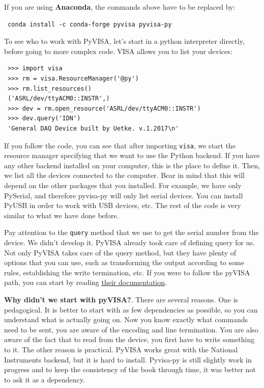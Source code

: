 If you are using \textbf{Anaconda}, the commands above have to be replaced by:

\begin{verbatim}
 conda install -c conda-forge pyvisa pyvisa-py
\end{verbatim}


To see who to work with PyVISA, let's start in a python interpreter directly, before going to more complex code. VISA allows you to list your devices:

\begin{verbatim}
 >>> import visa
 >>> rm = visa.ResourceManager('@py')
 >>> rm.list_resources()
 ('ASRL/dev/ttyACM0::INSTR',)
 >>> dev = rm.open_resource('ASRL/dev/ttyACM0::INSTR')
 >>> dev.query('IDN')
 'General DAQ Device built by Uetke. v.1.2017\n'
\end{verbatim}

If you follow the code, you can see that after importing \texttt{visa}, we start the resource manager specifying that we want to use the Python backend. If you have any other backend installed on your computer, this is the place to define it. Then, we list all the devices connected to the computer. Bear in mind that this will depend on the other packages that you installed. For example, we have only PySerial, and therefore pyvisa-py will only list serial devices. You can install PyUSB in order to work with USB devices, etc. The rest of the code is very similar to what we have done before.

Pay attention to the \texttt{query} method that we use to get the serial number from the device. We didn't develop it. PyVISA already took care of defining query for us. Not only PyVISA takes care of the query method, but they have plenty of options that you can use, such as transforming the output according to some rules, establishing the write termination, etc. If you were to follow the pyVISA path, you can start by reading \href{https://pyvisa.readthedocs.io/en/master/index.html}{their documentation}.

\textbf{Why didn't we start with pyVISA?}. There are several reasons. One is pedagogical. It is better to start with as few dependencies as possible, so you can understand what is actually going on. Now you know exactly what commands need to be sent, you are aware of the encoding and line termination. You are also aware of the fact that to read from the device, you first have to write something to it. The other reason is practical. PyVISA works great with the National Instruments backend, but it is hard to install. Pyvisa-py is still slightly work in progress and to keep the consistency of the book through time, it was better not to ask it as a dependency. 

